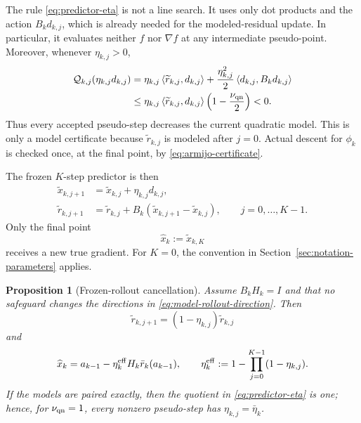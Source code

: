 \documentclass[10pt,leqno]{amsart}
\numberwithin{equation}{section}
\numberwithin{algorithm}{section}
\newtheorem{proposition}[theorem]{Proposition}
\theoremstyle{remark}
\newcommand{\ip}[2]{\left\langle #1,#2 \right\rangle}
\newcommand{\grad}{\nabla}
\begin{document}
The rule \eqref{eq:predictor-eta} is not a line search.  It uses only dot products and the action $B_kd_{k,j}$, which is already needed for the modeled-residual update.  In particular, it evaluates neither $f$ nor $\grad f$ at any intermediate pseudo-point.  Moreover, whenever $\eta_{k,j}>0$,
\begin{equation}
\label{eq:pseudo-model-decrease}
\begin{aligned}
\mathcal Q_{k,j}(\eta_{k,j}d_{k,j})
&=\eta_{k,j}\ip{\widetilde r_{k,j}}{d_{k,j}}
  +\frac{\eta_{k,j}^2}{2}\ip{d_{k,j}}{B_kd_{k,j}}\\
&\le
\eta_{k,j}\ip{\widetilde r_{k,j}}{d_{k,j}}
\left(1-\frac{\nu_{\rm qn}}{2}\right)<0.
\end{aligned}
\end{equation}
Thus every accepted pseudo-step decreases the current quadratic model.  This is only a model certificate because $\widetilde r_{k,j}$ is modeled after $j=0$.  Actual descent for $\phi_k$ is checked once, at the final point, by \eqref{eq:armijo-certificate}.

The frozen $K$-step predictor is then
\begin{align}
    \widetilde x_{k,j+1}&=\widetilde x_{k,j}+\eta_{k,j}d_{k,j},
    \label{eq:model-rollout-state}\\
    \widetilde r_{k,j+1}&=\widetilde r_{k,j}
       +B_k(\widetilde x_{k,j+1}-\widetilde x_{k,j}),
    \qquad j=0,\ldots,K-1.
    \label{eq:model-rollout-residual}
\end{align}
Only the final point
\begin{equation}
\label{eq:predictor-endpoint}
    \widehat x_k:=\widetilde x_{k,K}
\end{equation}
receives a new true gradient.  For $K=0$, the convention in Section~\ref{sec:notation-parameters} applies.

\begin{proposition}[Frozen-rollout cancellation]
\label{prop:frozen-cancellation-new}
Assume $B_kH_k=I$ and that no safeguard changes the directions in \eqref{eq:model-rollout-direction}.  Then
\begin{equation}
\label{eq:frozen-residual-cancel-new}
    \widetilde r_{k,j+1}=(1-\eta_{k,j})\widetilde r_{k,j}
\end{equation}
and
\begin{equation}
\label{eq:frozen-endpoint-new}
    \widehat x_k
    =a_{k-1}-\eta_k^{\rm eff}H_k\bar r_k(a_{k-1}),
    \qquad
    \eta_k^{\rm eff}:=1-\prod_{j=0}^{K-1}(1-\eta_{k,j}).
\end{equation}
If the models are paired exactly, then the quotient in \eqref{eq:predictor-eta} is one; hence, for $\nu_{\rm qn}=1$, every nonzero pseudo-step has $\eta_{k,j}=\bar\eta_k$.
\end{proposition}
\end{document}
